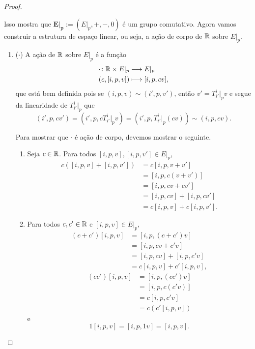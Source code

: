 \begin{proof}
\begin{enumerate}
Isso mostra que $\bm{E|_p} := (E|_p,+,-,0)$ é um grupo comutativo. Agora vamos construir a estrutura de espaço linear, ou seja, a ação de corpo de $\mathbb{R}$ sobre $E|_p$.

\begin{enumerate}
\item ($\cdot$) A ação de $\mathbb{R}$ sobre $E|_p$ é a função
	\begin{align*}
	{\cdot}\colon {\mathbb{R}\times E|_p} &\longrightarrow {E|_p} \\{(c,[i,p,v])} &\longmapsto [i,p,cv],
	\end{align*}
que está bem definida pois se $(i,p,v) \sim (i',p,v')$, então $v' = T^i_{i'}|_p v$ e segue da linearidade de $T^i_{i'}|_p$ que
	\begin{equation*}
	(i',p,cv') = (i',p,cT^i_{i'}|_p v) = (i',p,T^i_{i'}|_p (cv)) \sim (i,p,cv).
	\end{equation*}

Para mostrar que $\cdot$ é ação de corpo, devemos mostrar o seguinte.
	\begin{enumerate}
	\item Seja $c \in \mathbb{R}$. Para todos $[i,p,v], [i,p,v'] \in E|_p$,
		\begin{align*}
		c([i,p,v] + [i,p,v']) &= c[i,p,v+ v'] \\
			&= [i,p,c(v+v')] \\
			&= [i,p,cv+cv'] \\
			&= [i,p,cv] + [i,p,cv'] \\
			&= c[i,p,v] + c[i,p,v'].
		\end{align*}
	
	\item Para todos $c,c' \in \mathbb{R}$ e $[i,p,v] \in E|_p$,
		\begin{align*}
		(c+c')[i,p,v] &= [i,p,(c+c')v] \\
			&= [i,p,cv + c'v] \\
			&= [i,p,cv] + [i,p,c'v] \\
			&= c[i,p,v] + c'[i,p,v],
		\end{align*}
		\begin{align*}
		(cc')[i,p,v] &= [i,p,(cc')v] \\
			&= [i,p,c(c'v)] \\
			&= c[i,p,c'v] \\
			&= c(c'[i,p,v])
		\end{align*}	
e
		\begin{equation*}
		1[i,p,v] = [i,p,1v] = [i,p,v].
		\end{equation*}
	\end{enumerate}
\end{enumerate}


\end{enumerate}
\end{proof}

